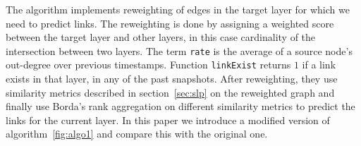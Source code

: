 The algorithm implements reweighting of edges in the target layer for which we
need  to predict links. The reweighting is done by assigning a weighted score
between the  target layer and other layers, in this case cardinality of the
intersection between two  layers. The term \texttt{rate} is the average of a
source node's out-degree over previous timestamps. Function \texttt{linkExist}
returns  $1$ if a link exists in that layer, in any of the past snapshots.
After reweighting, they use similarity metrics described in
section~\ref{sec:slp} on the reweighted graph and finally use Borda's rank
aggregation on different similarity metrics to predict the links for the
current layer. In this paper we introduce a modified version of
algorithm~\ref{fig:algo1} and compare  this with the original one.


















